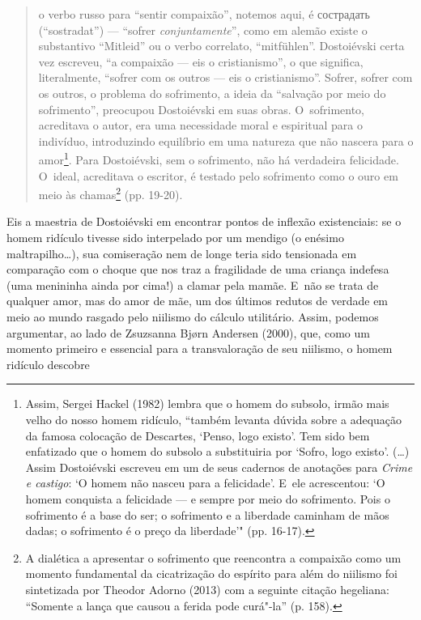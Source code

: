 \begin{quote}
o verbo russo para ``sentir compaixão'', notemos aqui, é
сострадать
(``sostradat'') --- ``sofrer \emph{conjuntamente}'', como em alemão
existe o substantivo ``Mitleid'' ou o verbo correlato, ``mitfühlen''.
Dostoiévski certa vez escreveu, ``a compaixão --- eis o cristianismo'', o
que significa, literalmente, ``sofrer com os outros --- eis o
cristianismo''. Sofrer, sofrer com os outros, o problema do sofrimento,
a ideia da ``salvação por meio do sofrimento'', preocupou Dostoiévski em
suas obras. O~sofrimento, acreditava o autor, era uma necessidade moral
e espiritual para o indivíduo, introduzindo equilíbrio em uma natureza
que não nascera para o amor\footnote{Assim, Sergei Hackel (1982) lembra
  que o homem do subsolo, irmão mais velho do nosso homem ridículo,
  ``também levanta dúvida sobre a adequação da famosa colocação de
  Descartes, `Penso, logo existo'. Tem sido bem enfatizado que o homem
  do subsolo a substituiria por `Sofro, logo existo'. (\ldots) Assim
  Dostoiévski escreveu em um de seus cadernos de anotações para
  \emph{Crime e castigo}: `O homem não nasceu para a felicidade'. E~ele
  acrescentou: `O homem conquista a felicidade --- e sempre por meio do
  sofrimento. Pois o sofrimento é a base do ser; o sofrimento e a
  liberdade caminham de mãos dadas; o sofrimento é o preço da
  liberdade'" (pp. 16-17).}. Para Dostoiévski, sem o sofrimento, não há
verdadeira felicidade. O~ideal, acreditava o escritor, é testado pelo
sofrimento como o ouro em meio às chamas\footnote{A dialética a
  apresentar o sofrimento que reencontra a compaixão como um momento
  fundamental da cicatrização do espírito para além do niilismo foi
  sintetizada por Theodor Adorno (2013) com a seguinte citação
  hegeliana: ``Somente a lança que causou a ferida pode curá"-la'' (p.
  158).} (pp. 19-20).
\end{quote}

Eis a maestria de Dostoiévski em encontrar pontos de inflexão
existenciais: se o homem ridículo tivesse sido interpelado por um
mendigo (o enésimo maltrapilho\ldots{}), sua comiseração nem de longe
teria sido tensionada em comparação com o choque que nos traz a
fragilidade de uma criança indefesa (uma menininha ainda por cima!) a
clamar pela mamãe. E~não se trata de qualquer amor, mas do amor de mãe,
um dos últimos redutos de verdade em meio ao mundo rasgado pelo niilismo
do cálculo utilitário. Assim, podemos argumentar, ao lado de Zsuzsanna
Bjørn Andersen (2000), que, como um momento primeiro e essencial para a
transvaloração de seu niilismo, o homem ridículo descobre


